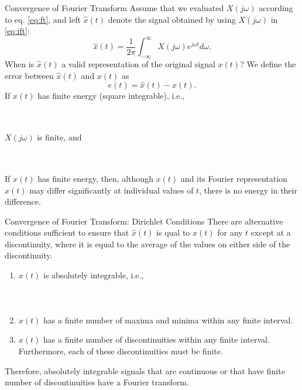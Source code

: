 \begin{frame}[plain]{Convergence of Fourier Transform}
    Assume that we evaluated $X(j\omega)$ according to eq. \ref{eq:ft}, and left $\hat{x}(t)$ denote the signal obtained by using $X(j\omega)$ in \ref{eq:ift}:
    \begin{equation*}
        \hat{x}(t) = \frac{1}{2\pi}\int_{-\infty}^{\infty}X(j\omega)e^{j\omega t} d\omega.
    \end{equation*}
    When is $\hat{x}(t)$  a valid representation of the original signal $x(t)$? We define the error between $\hat{x}(t)$ and $x(t)$ as
    \begin{equation*}
        e(t) = \hat{x}(t) - x(t).
    \end{equation*}
{
    If $x(t)$ has finite energy (square integrable), i.e.,
    \begin{equation}
        \fillblank{\int_{-\infty}^{\infty}|x(t)|^2dt < \infty,}
    \end{equation}
    $X(j\omega)$ is finite, and
    \begin{equation}
        \fillblank{\int_{-\infty}^{\infty}|e(t)|^2dt = 0,}
    \end{equation}
    If $x(t)$ has finite energy, then, although $x(t)$ and its Fourier representation  $\hat{x}(t)$ may differ significantly at individual values of $t$, there is no  energy in their difference.
}
\end{frame}

\begin{frame}[plain]{Convergence of Fourier Transform: Dirichlet Conditions}
    There are alternative conditions sufficient to ensure that  $\hat{x}(t)$ is qual to $x(t)$ for any $t$ except at a discontinuity, where it is equal to the average of the values on either side of the discontinuity.
{
    \begin{enumerate}
        \item $x(t)$ is absolutely integrable, i.e.,
            \begin{equation}
                \fillblank{\int_{-\infty}^{\infty}|x(t)|dt < \infty,}
            \end{equation}
        \item $x(t)$ has a finite number of maxima and minima within any finite interval.
        \item $x(t)$ has a finite number of discontinuities within any finite interval. Furthermore, each of these discontinuities must be finite.
    \end{enumerate}
    Therefore, absolutely integrable signals that are continuous or that have finite number of discontinuities have a Fourier transform.
}
\end{frame}

